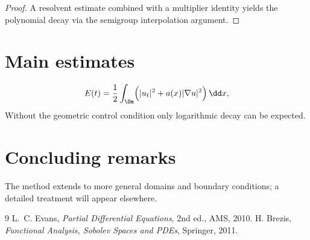 \begin{proof}
A resolvent estimate combined with a multiplier identity yields the polynomial decay via the semigroup interpolation argument.
\end{proof}

\section{Main estimates}
\begin{equation}
E(t)=\frac12\int_\Om\Bigl(|u_t|^2+a(x)|\nabla u|^2\Bigr)\,\dd x,
\end{equation}
Without the geometric control condition only logarithmic decay can be expected.

\section{Concluding remarks}
The method extends to more general domains and boundary conditions; a detailed
treatment will appear elsewhere.

\begin{thebibliography}{9}
 L.~C. Evans, \emph{Partial Differential Equations}, 2nd ed., AMS, 2010.
 H. Brezis, \emph{Functional Analysis, Sobolev Spaces and PDEs}, Springer, 2011.
\end{thebibliography}

